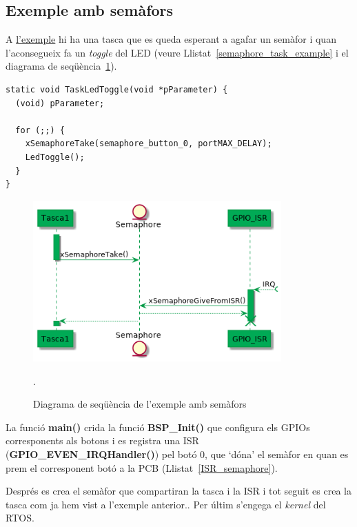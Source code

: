 \subsection{Exemple amb semàfors}
\label{sub:semafors_exemple}
A \href{https://github.com/mariusmm/cursembedded/tree/master/Simplicity/FreeRTOS_Semaphore}{l'exemple} hi ha una tasca que es queda esperant a agafar un semàfor i quan l'aconsegueix fa un {\em toggle} del LED (veure Llistat~\ref{semaphore_task_example} i el diagrama de seqüència~\ref{fig:SeqDiagramSemaphore}).

\begin{lstlisting}[style=customc,caption=Tasca amb semàfor d'exemple,label=semaphore_task_example]
static void TaskLedToggle(void *pParameter) {
  (void) pParameter;

  for (;;) {
    xSemaphoreTake(semaphore_button_0, portMAX_DELAY);
    LedToggle();
  }
}
\end{lstlisting}


\begin{figure}
 \centering
 \includegraphics[width=0.85\textwidth, keepaspectratio]{imatges/SemaphoreFreeRTOS.png}
 \caption{Diagrama de seqüència de l'exemple amb semàfors}.
 \label{fig:SeqDiagramSemaphore}
\end{figure}


La funció {\bf main()} crida la funció {\bf BSP\_Init()} que configura els GPIOs corresponents als botons i es registra una \gls{ISR} ({\bf GPIO\_EVEN\_IRQHandler()}) pel botó 0, que ‘dóna' el semàfor en quan es prem el corresponent botó a la PCB (Llistat~\ref{ISR_semaphore}).

Després es crea el semàfor que compartiran la tasca i la ISR i tot seguit es crea la tasca com ja hem vist a l'exemple anterior..
Per últim s'engega el {\em kernel} del RTOS.

